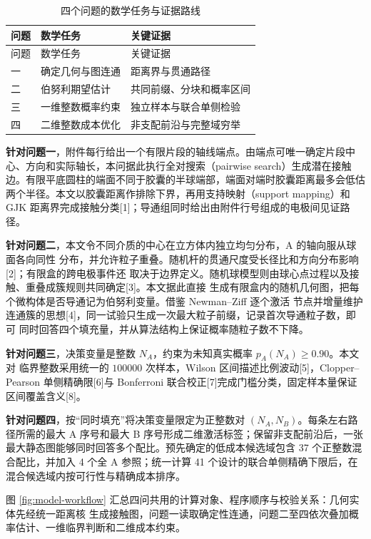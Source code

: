 \begin{longtable}[]{@{}lll@{}}
\caption{四个问题的数学任务与证据路线}\tabularnewline
\toprule\noalign{}
问题 & 数学任务 & 关键证据 \\
\midrule\noalign{}
\endfirsthead
\toprule\noalign{}
问题 & 数学任务 & 关键证据 \\
\midrule\noalign{}
\endhead
\bottomrule\noalign{}
\endlastfoot
一 & 确定几何与图连通 & 距离界与贯通路径 \\
二 & 伯努利期望估计 & 共同前缀、分块和概率区间 \\
三 & 一维整数概率约束 & 独立样本与联合单侧检验 \\
四 & 二维整数成本优化 & 非支配前沿与完整域穷举 \\
\end{longtable}

\textbf{针对问题一}，附件每行给出一个有限片段的轴线端点。由端点可唯一确定片段中心、方向和实际轴长，本问据此执行全对搜索（pairwise search）生成潜在接触边。有限平底圆柱的端面不同于胶囊的半球端部，端面对端时胶囊距离最多会低估两个半径。本文以胶囊距离作排除下界，再用支持映射（support mapping）和 GJK 距离界完成接触分类{[}1{]}；导通组同时给出由附件行号组成的电极间见证路径。

\textbf{针对问题二}，本文令不同介质的中心在立方体内独立均匀分布，A 的轴向服从球面各向同性 分布，并允许粒子重叠。随机杆的贯通尺度受长径比和方向分布影响{[}2{]}；有限盒的跨电极事件还 取决于边界定义。随机球模型则由球心点过程以及接触、重叠成簇规则共同确定{[}3{]}。本文据此直接 生成有限盒内的随机几何图，把每个微构体是否导通记为伯努利变量。借鉴 Newman--Ziff 逐个激活 节点并增量维护连通簇的思想{[}4{]}，同一试验只生成一次最大粒子前缀，记录首次导通粒子数，即可 同时回答四个填充量，并从算法结构上保证概率随粒子数不下降。

\textbf{针对问题三}，决策变量是整数 \(N_A\)，约束为未知真实概率 \(p_A(N_A)\ge0.90\)。本文对 临界整数采用统一的 \(100000\) 次样本，Wilson 区间描述比例波动{[}5{]}，Clopper--Pearson 单侧精确限{[}6{]}与 Bonferroni 联合校正{[}7{]}完成门槛分类，固定样本量保证区间覆盖含义{[}8{]}。

\textbf{针对问题四}，按``同时填充''将决策变量限定为正整数对 \((N_A,N_B)\)。每条左右路径所需的最大 A 序号和最大 B 序号形成二维激活标签；保留非支配前沿后，一张最大静态图能够同时回答多个配比。预先确定的低成本候选域包含 37 个正整数混合配比，并加入 4 个全 A 参照；统一计算 41 个设计的联合单侧精确下限后，在混合候选域内按可行性与精确成本排序。

图 \ref{fig:model-workflow} 汇总四问共用的计算对象、程序顺序与校验关系：几何实体先经统一距离核 生成接触图，问题一读取确定性连通，问题二至四依次叠加概率估计、一维临界判断和二维成本约束。

